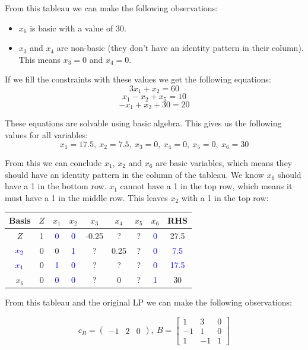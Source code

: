 \documentclass[12pt]{article}
\begin{document}
\noindent
From this tableau we can make the following observations:

\begin{itemize}
  \item $x_6$ is basic with a value of 30.
  \item $x_3$ and $x_4$ are non-basic (they don't have an identity pattern in their column). This means $x_3 = 0$ and $x_4 = 0$.
\end{itemize}

\noindent
If we fill the constraints with these values we get the following equations:
\[ 3x_1 + x_2 = 60 \]
\[ x_1 - x_2 + x_5 = 10 \]
\[ -x_1 + x_2 + 30 = 20 \]

\newpage
\noindent
These equations are solvable using basic algebra.
This gives us the following values for all variables:
\[ x_1 = 17.5,\ x_2 = 7.5,\ x_3 = 0,\ x_4 = 0,\ x_5 = 0,\ x_6 = 30 \]

\noindent
From this we can conclude $x_1$, $x_2$ and $x_6$ are basic variables, which means they should have an identity pattern in the column of the tableau.
We know $x_6$ should have a 1 in the bottom row.
$x_1$ cannot have a 1 in the top row, which means it must have a 1 in the middle row.
This leaves $x_2$ with a 1 in the top row:

\begin{table}[h]
  \centering
  \begin{tabular}{c|c|ccc|ccc|c}
  Basis & $Z$ & $x_1$ & $x_2$ & $x_3$ & $x_4$ & $x_5$ & $x_6$ & RHS \\ \hline
  $Z$ & 1 & \textcolor{blue}{0} & \textcolor{blue}{0} & -0.25 & ? & ? & \textcolor{blue}{0} & 27.5 \\ \hline
  $\textcolor{blue}{x_2}$ & 0 & 0 & \textcolor{blue}{1} & ? & 0.25 & ? & \textcolor{blue}{0} & \textcolor{blue}{7.5} \\
  $\textcolor{blue}{x_1}$ & 0 & \textcolor{blue}{1} & \textcolor{blue}{0} & ? & ? & ? & \textcolor{blue}{0} & \textcolor{blue}{17.5} \\
  $x_6$ & 0 & \textcolor{blue}{0} & \textcolor{blue}{0} & ? & 0 & ? & \textcolor{blue}{1} & 30
  \end{tabular}
\end{table}

\noindent
From this tableau and the original LP we can make the following observations:

\begin{equation*}
    c_B = \begin{pmatrix}
      -1 & 2 & 0
    \end{pmatrix},\ 
    B = \begin{bmatrix}
       1 &  3 & 0 \\
      -1 &  1 & 0 \\
       1 & -1 & 1
    \end{bmatrix}
\end{equation*}
\end{document}
